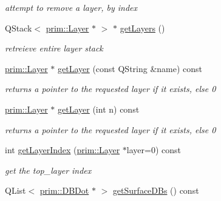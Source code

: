 \begin{DoxyCompactItemize}
\begin{DoxyCompactList}\small\item\em attempt to remove a layer, by index \end{DoxyCompactList}\item 
Q\+Stack$<$ \hyperlink{classprim_1_1Layer}{prim\+::\+Layer} $\ast$ $>$ $\ast$ \hyperlink{classgui_1_1DesignPanel_a37c853a23855ab9decd03e62e19acf9a}{get\+Layers} ()\hypertarget{classgui_1_1DesignPanel_a37c853a23855ab9decd03e62e19acf9a}{}\label{classgui_1_1DesignPanel_a37c853a23855ab9decd03e62e19acf9a}

\begin{DoxyCompactList}\small\item\em retreieve entire layer stack \end{DoxyCompactList}\item 
\hyperlink{classprim_1_1Layer}{prim\+::\+Layer} $\ast$ \hyperlink{classgui_1_1DesignPanel_a5f40ad8c6d43050e7c44372a2aedc201}{get\+Layer} (const Q\+String \&name) const \hypertarget{classgui_1_1DesignPanel_a5f40ad8c6d43050e7c44372a2aedc201}{}\label{classgui_1_1DesignPanel_a5f40ad8c6d43050e7c44372a2aedc201}

\begin{DoxyCompactList}\small\item\em returns a pointer to the requested layer if it exists, else 0 \end{DoxyCompactList}\item 
\hyperlink{classprim_1_1Layer}{prim\+::\+Layer} $\ast$ \hyperlink{classgui_1_1DesignPanel_aa12c068c0cd6421f11b679c1856a8d63}{get\+Layer} (int n) const \hypertarget{classgui_1_1DesignPanel_aa12c068c0cd6421f11b679c1856a8d63}{}\label{classgui_1_1DesignPanel_aa12c068c0cd6421f11b679c1856a8d63}

\begin{DoxyCompactList}\small\item\em returns a pointer to the requested layer if it exists, else 0 \end{DoxyCompactList}\item 
int \hyperlink{classgui_1_1DesignPanel_a0deef29e6145edfcbc5af3d08fb33eff}{get\+Layer\+Index} (\hyperlink{classprim_1_1Layer}{prim\+::\+Layer} $\ast$layer=0) const \hypertarget{classgui_1_1DesignPanel_a0deef29e6145edfcbc5af3d08fb33eff}{}\label{classgui_1_1DesignPanel_a0deef29e6145edfcbc5af3d08fb33eff}

\begin{DoxyCompactList}\small\item\em get the top\+\_\+layer index \end{DoxyCompactList}\item 
Q\+List$<$ \hyperlink{classprim_1_1DBDot}{prim\+::\+D\+B\+Dot} $\ast$ $>$ \hyperlink{classgui_1_1DesignPanel_afa6c4d2e128789c3a194f9cadcf7b863}{get\+Surface\+D\+Bs} () const \hypertarget{classgui_1_1DesignPanel_afa6c4d2e128789c3a194f9cadcf7b863}{}\label{classgui_1_1DesignPanel_afa6c4d2e128789c3a194f9cadcf7b863}


\end{DoxyCompactItemize}
